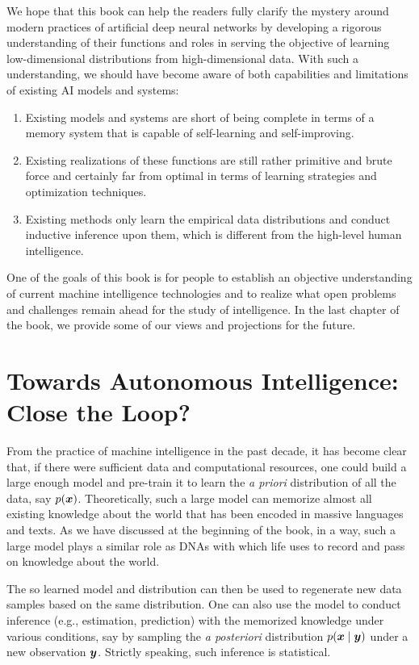 \documentclass[../../book-main.tex]{subfiles}
\begin{document}
We hope that this book can help the readers fully clarify the mystery around modern practices of artificial deep neural networks by developing a rigorous understanding of their functions and roles in serving the objective of learning low-dimensional distributions from high-dimensional data. With such a understanding, we should have become aware of both capabilities and limitations of existing AI models and systems: 
\begin{enumerate}
    \item Existing models and systems are short of being complete in terms of a memory system that is capable of self-learning and self-improving.
    \item Existing realizations of these functions are still rather primitive and brute force and certainly far from optimal in terms of learning strategies and optimization techniques. 
    \item Existing methods only learn the empirical data distributions and conduct inductive inference upon them, which is different from the high-level human intelligence.
\end{enumerate} 

One of the goals of this book is for people to establish an objective understanding of current machine intelligence technologies and to realize what open problems and challenges remain ahead for the study of intelligence. In the last chapter of the book, we provide some of our views and projections for the future. 

\section{Towards Autonomous Intelligence: Close the Loop?}
From the practice of machine intelligence in the past decade, it has become clear that, if there were sufficient data and computational resources, one could build a large enough model and pre-train it to learn the {\em a priori} distribution of all the data, say $p(\bm{x})$. Theoretically, such a large model can memorize almost all existing knowledge about the world that has been encoded in massive languages and texts. As we have discussed at the beginning of the book, in a way, such a large model plays a similar role as DNAs with which life uses to record and pass on knowledge about the world.  

The so learned model and distribution can then be used to regenerate new data samples based on the same distribution. One can also use the model to conduct inference (e.g., estimation, prediction) with the memorized knowledge under various conditions, say by sampling the {\em a posteriori} distribution $p(\bm{x}\mid \bm{y})$ under a new observation $\bm{y}$. Strictly speaking, such inference is statistical. 
\end{document}

